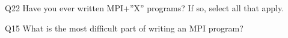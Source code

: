 \begin{description}%
\item{Q22} Have you ever written MPI+”X” programs? If so, select all that apply.%
\item{Q15} What is the most difficult part of writing an MPI program?%
\end{description}%
